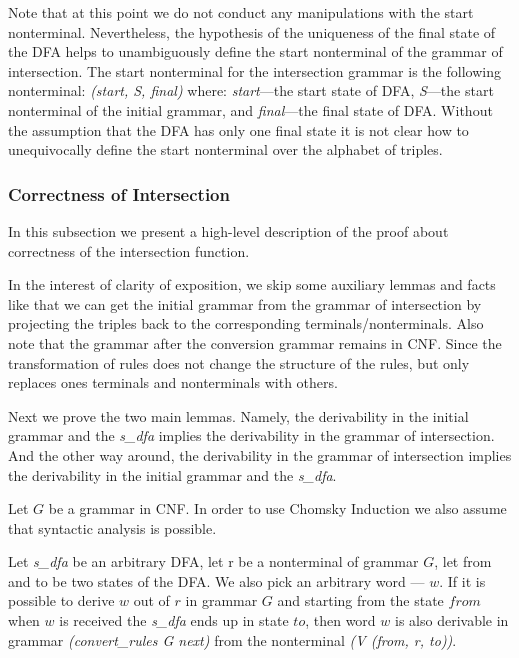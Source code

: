 Note that at this point we do not conduct any manipulations with the start nonterminal. Nevertheless, the hypothesis of the uniqueness of the final state of the DFA helps to unambiguously define the start nonterminal of the grammar of intersection. The start nonterminal for the intersection grammar is the following nonterminal: \textit{(start, S, final)} where: \textit{start}---the start state of DFA, \textit{S}---the start nonterminal of the initial grammar, and \textit{final}---the final state of DFA. Without the assumption that the DFA has only one final state it is not clear how to unequivocally define the start nonterminal over the alphabet of triples.

\subsubsection{Correctness of Intersection}
\label{sec:correctintersection}

In this subsection we present a high-level description of the proof about correctness of the intersection function.

In the interest of clarity of exposition, we skip some auxiliary lemmas and facts like that we can get the initial grammar from the grammar of intersection by projecting the triples back to the corresponding terminals/nonterminals. Also note that the grammar after the conversion grammar remains in CNF. Since the transformation of rules does not change the structure of the rules, but only replaces ones terminals and nonterminals with others.

Next we prove the two main lemmas. Namely, the derivability in the initial grammar and the \textit{s\_dfa} implies the derivability in the grammar of intersection. And the other way around, the derivability in the grammar of intersection implies the derivability in the initial grammar and the \textit{s\_dfa}.

Let $G$ be a grammar in CNF. In order to use Chomsky Induction we also assume that syntactic analysis is possible. 


\begin{theorem}
    Let \textit{s\_dfa} be an arbitrary DFA, let r be a nonterminal of grammar $G$, let from and to be two states of the DFA. We also pick an arbitrary word --- $w$. If it is possible to derive $w$ out of $r$ in grammar $G$ and starting from the state $from$ when $w$ is received the \textit{s\_dfa} ends up in state $to$, then word $w$ is also derivable in grammar \textit{(convert\_rules G next)} from the nonterminal \textit{(V (from, r, to))}.
\end{theorem}

